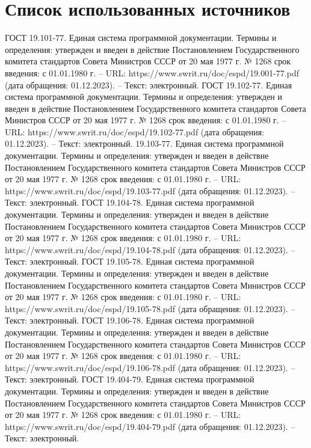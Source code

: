 \documentclass{article}
\begin{document}
    \section*{Список использованных источников}
    \begin{thebibliography}{}
         ГОСТ 19.101-77. Единая система программной документации. Термины и определения: утвержден и введен в действие Постановлением Государственного комитета стандартов Совета Министров СССР от 20 мая 1977 г. № 1268 срок введения: с 01.01.1980 г. – URL: https://www.swrit.ru/doc/espd/19.001-77.pdf (дата обращения: 01.12.2023). – Текст: электронный.
         ГОСТ 19.102-77. Единая система программной документации. Термины и определения: утвержден и введен в действие Постановлением Государственного комитета стандартов Совета Министров СССР от 20 мая 1977 г. № 1268 срок введения: с 01.01.1980 г. – URL: https://www.swrit.ru/doc/espd/19.102-77.pdf (дата обращения: 01.12.2023). – Текст: электронный.
         19.103-77. Единая система программной документации. Термины и определения: утвержден и введен в действие Постановлением Государственного комитета стандартов Совета Министров СССР от 20 мая 1977 г. № 1268 срок введения: с 01.01.1980 г. – URL: https://www.swrit.ru/doc/espd/19.103-77.pdf (дата обращения: 01.12.2023). – Текст: электронный.
         ГОСТ 19.104-78. Единая система программной документации. Термины и определения: утвержден и введен в действие Постановлением Государственного комитета стандартов Совета Министров СССР от 20 мая 1977 г. № 1268 срок введения: с 01.01.1980 г. – URL: https://www.swrit.ru/doc/espd/19.104-78.pdf (дата обращения: 01.12.2023). – Текст: электронный.
         ГОСТ 19.105-78. Единая система программной документации. Термины и определения: утвержден и введен в действие Постановлением Государственного комитета стандартов Совета Министров СССР от 20 мая 1977 г. № 1268 срок введения: с 01.01.1980 г. – URL: https://www.swrit.ru/doc/espd/19.105-78.pdf (дата обращения: 01.12.2023). – Текст: электронный.
         ГОСТ 19.106-78. Единая система программной документации. Термины и определения: утвержден и введен в действие Постановлением Государственного комитета стандартов Совета Министров СССР от 20 мая 1977 г. № 1268 срок введения: с 01.01.1980 г. – URL: https://www.swrit.ru/doc/espd/19.106-78.pdf (дата обращения: 01.12.2023). – Текст: электронный.
         ГОСТ 19.404-79. Единая система программной документации. Термины и определения: утвержден и введен в действие Постановлением Государственного комитета стандартов Совета Министров СССР от 20 мая 1977 г. № 1268 срок введения: с 01.01.1980 г. – URL: https://www.swrit.ru/doc/espd/19.404-79.pdf (дата обращения: 01.12.2023). – Текст: электронный.

\end{thebibliography}
\end{document}
